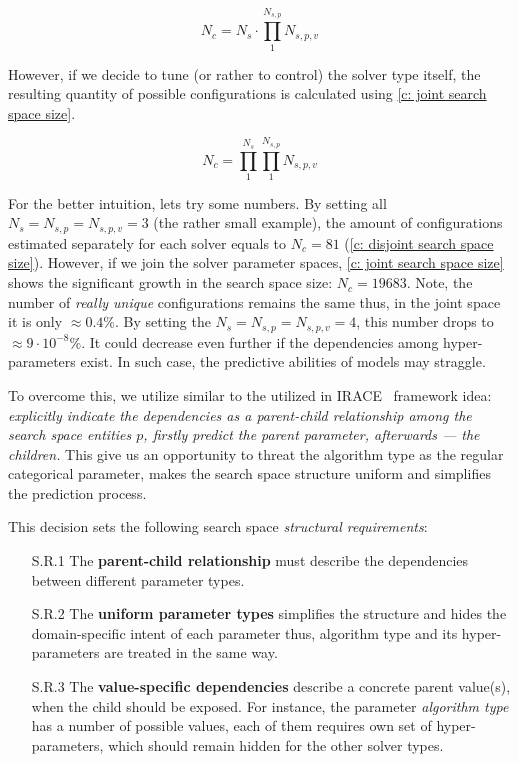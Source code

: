 \begin{equation}
N_c = N_s \cdot \prod_{1}^{N_{s,p}} N_{s,p,v}
\label{c: disjoint search space size}
\end{equation}

However, if we decide to tune (or rather to control) the solver type itself, the resulting quantity of possible configurations is calculated using \cref{c: joint search space size}.

\begin{equation}
N_c = \prod_{1}^{N_{s}} \prod_{1}^{N_{s,p}} N_{s,p,v}
\label{c: joint search space size}
\end{equation}

For the better intuition, lets try some numbers. By setting all $N_s = N_{s,p} = N_{s,p,v} = 3$ (the rather small example), the amount of configurations estimated separately for each solver equals to $N_c = 81$ (\cref{c: disjoint search space size}). However, if we join the solver parameter spaces, \cref{c: joint search space size} shows the significant growth in the search space size: $N_c = 19683$. Note, the number of \emph{really unique} configurations remains the same thus, in the joint space it is only $\approx 0.4\%$. By setting the $N_s = N_{s,p} = N_{s,p,v} = 4$, this number drops to $\approx 9 \cdot 10^{-8}\%$. It could decrease even further if the dependencies among hyper-parameters exist. In such case, the predictive abilities of models may straggle.

To overcome this, we utilize similar to the utilized in IRACE~\cite{lopez2016irace} framework idea: \emph{explicitly indicate the dependencies as a parent-child relationship among the search space entities $p$, firstly predict the parent parameter, afterwards — the children.} This give us an opportunity to threat the algorithm type as the regular categorical parameter, makes the search space structure uniform and simplifies the prediction process.

This decision sets the following search space \emph{structural requirements}:
\begin{enumerate}
	\item[S.R.1] The \textbf{parent-child relationship} must describe the dependencies between different parameter types.

	\item[S.R.2] The \textbf{uniform parameter types} simplifies the structure and hides the domain-specific intent of each parameter thus, algorithm type and its hyper-parameters are treated in the same way.

	\item[S.R.3] The \textbf{value-specific dependencies} describe a concrete parent value(s), when the child should be exposed. For instance, the parameter \textit{algorithm type} has a number of possible values, each of them requires own set of hyper-parameters, which should remain hidden for the other solver types.
\end{enumerate}

